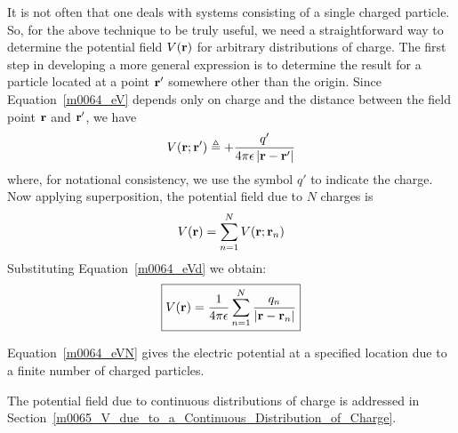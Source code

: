 It is not often that one deals with systems consisting of a single charged particle.
So, for the above technique to be truly useful, we need a straightforward way to determine the potential field $V({\bf r})$ for arbitrary distributions of charge.
The first step in developing a more general expression is to determine the result for a particle located at a point ${\bf r}'$ somewhere other than the origin.
Since Equation~\ref{m0064_eV} depends only on charge and the distance between the field point ${\bf r}$ and ${\bf r}'$, we have
%
\begin{equation}
V({\bf r};{\bf r}') \triangleq + \frac{q'}{4\pi\epsilon \left|{\bf r}-{\bf r}'\right|}
\label{m0064_eVd}
\end{equation}
%
where, for notational consistency, we use the symbol $q'$ to indicate the charge.
Now applying superposition, the potential field due to $N$ charges is
%
\begin{equation}
V({\bf r}) = \sum_{n=1}^N { V({\bf r};{\bf r}_n) }
\end{equation}
%
Substituting Equation~\ref{m0064_eVd} we obtain:
%
\begin{equation}
\boxed{
V({\bf r}) = \frac{1}{4\pi\epsilon} \sum_{n=1}^N { \frac{q_n}{\left|{\bf r}-{\bf r}_n\right|} }
}
\label{m0064_eVN}
\end{equation}
%
\begin{mdframed}[backgroundcolor=yellow!20,nobreak=true] 
Equation~\ref{m0064_eVN} gives the electric potential at a specified location due to a finite number of charged particles.
\end{mdframed}
%
The potential field due to continuous distributions of charge is addressed in Section~\ref{m0065_V_due_to_a_Continuous_Distribution_of_Charge}. 


